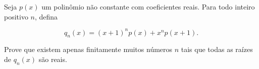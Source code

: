 Seja \(p(x)\) um polinômio não constante com coeficientes reais. Para todo inteiro positivo \(n\), defina 

\[
q_n(x) = (x+1)^n p(x) + x^n p(x+1).
\]

Prove que existem apenas finitamente muitos números \(n\) tais que todas as raízes de \(q_n(x)\) são reais.
